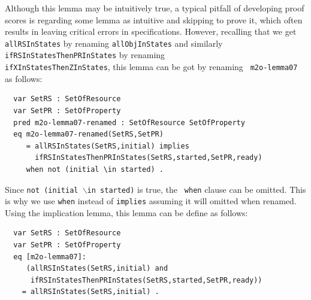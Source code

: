 \documentclass[12pt]{report}
\newcommand{\stt}[1]{{\small{\tt {#1}}}}
\begin{document}
Although this lemma may be intuitively true, a typical pitfall of
developing proof scores is regarding some lemma as intuitive and
skipping to prove it, which often results in leaving critical errors
in specifications. However, recalling that we get {\tt allRSInStates}
by renaming {\tt allObjInStates} and similarly
{\tt ifRSInStatesThenPRInStates} by renaming\\
{\tt ifXInStatesThenZInStates}, this lemma can be got by renaming {\tt
  m2o-lemma07} as follows:
\begin{verbatim}
  var SetRS : SetOfResource
  var SetPR : SetOfProperty
  pred m2o-lemma07-renamed : SetOfResource SetOfProperty
  eq m2o-lemma07-renamed(SetRS,SetPR)
     = allRSInStates(SetRS,initial) implies 
       ifRSInStatesThenPRInStates(SetRS,started,SetPR,ready)
     when not (initial \in started) .
\end{verbatim}
Since \stt{not (initial $\backslash$in started)} is true, the {\tt
  when} clause can be omitted. This is why we use {\tt when} instead
of {\tt implies} assuming it will omitted when renamed. Using the
implication lemma, this lemma can be define as follows:
\begin{verbatim}
  var SetRS : SetOfResource
  var SetPR : SetOfProperty
  eq [m2o-lemma07]:
     (allRSInStates(SetRS,initial) and
      ifRSInStatesThenPRInStates(SetRS,started,SetPR,ready))
    = allRSInStates(SetRS,initial) .
\end{verbatim}
\end{document}
